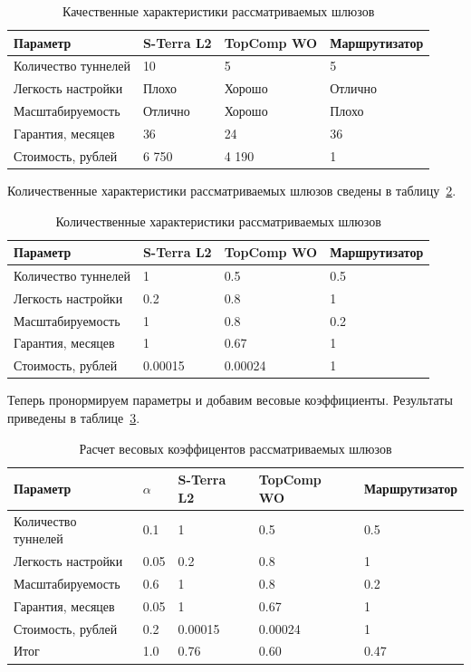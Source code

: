 \documentclass[russian,utf8,emptystyle]{eskdtext}
\begin{document}
\begin{longtable}{p{7cm}|p{2cm}|p{2cm}|p{2cm}}
\caption{Качественные характеристики рассматриваемых шлюзов}
\label{tab:vpn-1} \\
Параметр                     & S-Terra L2 & TopComp WO & Маршрутизатор \\ 
\hline 
Количество туннелей          & 10         & 5          & 5        \\ 
Легкость настройки           & Плохо      & Хорошо     & Отлично  \\ 
Масштабируемость             & Отлично    & Хорошо     & Плохо    \\ 
Гарантия, месяцев            & 36         & 24         & 36       \\ 
Стоимость, рублей            & 6 750      & 4 190      & 1        \\
\end{longtable}

Количественные характеристики рассматриваемых шлюзов сведены в таблицу~\ref{tab:vpn-2}.

\begin{longtable}{p{7cm}|p{2cm}|p{2cm}|p{2cm}}
\caption{Количественные характеристики рассматриваемых шлюзов}
\label{tab:vpn-2} \\
Параметр                     & S-Terra L2 & TopComp WO & Маршрутизатор \\ 
\hline 
Количество туннелей          & 1          & 0.5        & 0.5        \\ 
Легкость настройки           & 0.2        & 0.8        & 1       \\ 
Масштабируемость             & 1          & 0.8        & 0.2    \\ 
Гарантия, месяцев            & 1          & 0.67       & 1       \\ 
Стоимость, рублей            & 0.00015    & 0.00024    & 1        \\
\end{longtable}

Теперь пронормируем параметры и добавим весовые коэффициенты. Результаты приведены в таблице~\ref{tab:vpn-3}.
\begin{longtable}{p{7cm}|p{1cm}|p{2cm}|p{2cm}|p{2cm}}
\caption{Расчет весовых коэффицентов рассматриваемых шлюзов}
\label{tab:vpn-3} \\
Параметр                     & $\alpha$ & S-Terra L2 & TopComp WO & Маршрутизатор \\ 
\hline 
Количество туннелей          & 0.1      & 1          & 0.5        & 0.5        \\ 
Легкость настройки           & 0.05     & 0.2        & 0.8        & 1       \\ 
Масштабируемость             & 0.6      & 1          & 0.8        & 0.2    \\ 
Гарантия, месяцев            & 0.05     & 1          & 0.67       & 1       \\ 
Стоимость, рублей            & 0.2      & 0.00015    & 0.00024    & 1        \\
\hline
Итог                         & 1.0      & 0.76       & 0.60       & 0.47
\end{longtable}
\end{document}
